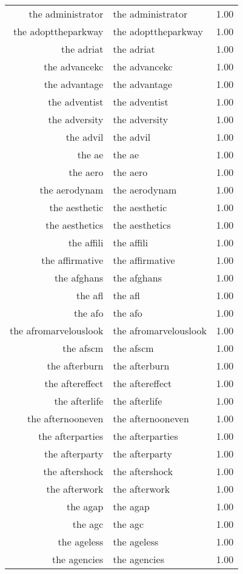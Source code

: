 \begin{table}[ht]
\begin{tabular}{rlr}
  the administrator & the administrator & 1.00 \\ 
  the adopttheparkway & the adopttheparkway & 1.00 \\ 
  the adriat & the adriat & 1.00 \\ 
  the advancekc & the advancekc & 1.00 \\ 
  the advantage & the advantage & 1.00 \\ 
  the adventist & the adventist & 1.00 \\ 
  the adversity & the adversity & 1.00 \\ 
  the advil & the advil & 1.00 \\ 
  the ae & the ae & 1.00 \\ 
  the aero & the aero & 1.00 \\ 
  the aerodynam & the aerodynam & 1.00 \\ 
  the aesthetic & the aesthetic & 1.00 \\ 
  the aesthetics & the aesthetics & 1.00 \\ 
  the affili & the affili & 1.00 \\ 
  the affirmative & the affirmative & 1.00 \\ 
  the afghans & the afghans & 1.00 \\ 
  the afl & the afl & 1.00 \\ 
  the afo & the afo & 1.00 \\ 
  the afromarvelouslook & the afromarvelouslook & 1.00 \\ 
  the afscm & the afscm & 1.00 \\ 
  the afterburn & the afterburn & 1.00 \\ 
  the aftereffect & the aftereffect & 1.00 \\ 
  the afterlife & the afterlife & 1.00 \\ 
  the afternooneven & the afternooneven & 1.00 \\ 
  the afterparties & the afterparties & 1.00 \\ 
  the afterparty & the afterparty & 1.00 \\ 
  the aftershock & the aftershock & 1.00 \\ 
  the afterwork & the afterwork & 1.00 \\ 
  the agap & the agap & 1.00 \\ 
  the agc & the agc & 1.00 \\ 
  the ageless & the ageless & 1.00 \\ 
  the agencies & the agencies & 1.00 \\ 

\end{tabular}
\end{table}
